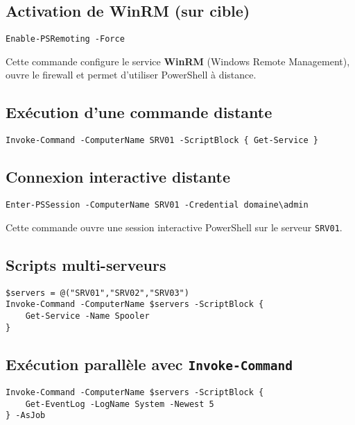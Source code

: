 \documentclass[a4paper,12pt]{article}
\begin{document}
\subsection{Activation de WinRM (sur cible)}
\begin{verbatim}
Enable-PSRemoting -Force
\end{verbatim}
\begin{tcolorbox}[colback=yellow!5!white,colframe=yellow!60!black]
Cette commande configure le service \textbf{WinRM} (Windows Remote Management), ouvre le firewall et permet d’utiliser PowerShell à distance.
\end{tcolorbox}

\subsection{Exécution d’une commande distante}
\begin{verbatim}
Invoke-Command -ComputerName SRV01 -ScriptBlock { Get-Service }
\end{verbatim}

\subsection{Connexion interactive distante}
\begin{verbatim}
Enter-PSSession -ComputerName SRV01 -Credential domaine\admin
\end{verbatim}
\begin{tcolorbox}[colback=green!5!white,colframe=green!60!black]
Cette commande ouvre une session interactive PowerShell sur le serveur \texttt{SRV01}.
\end{tcolorbox}

\subsection{Scripts multi-serveurs}
\begin{verbatim}
$servers = @("SRV01","SRV02","SRV03")
Invoke-Command -ComputerName $servers -ScriptBlock {
    Get-Service -Name Spooler
}
\end{verbatim}

\subsection{Exécution parallèle avec \texttt{Invoke-Command}}
\begin{verbatim}
Invoke-Command -ComputerName $servers -ScriptBlock {
    Get-EventLog -LogName System -Newest 5
} -AsJob
\end{verbatim}
\end{document}
